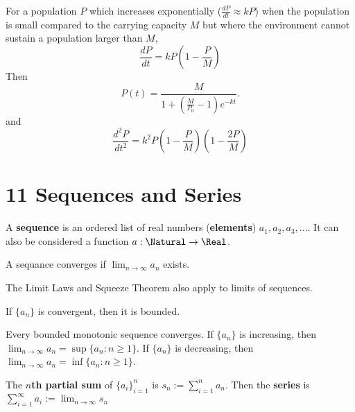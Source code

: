 \begin{definition} For a population $P$ which increases exponentially ($\frac{dP}{dt} \approx kP$) when the population is small compared to the carrying capacity $M$ but where the environment cannot sustain a population larger than $M$,
  \[
    \frac{dP}{dt} = kP \left(1 - \frac{P}{M}\right)
  \]
  Then
  \[
    P(t) = \frac{M}{1 + \left(\frac{M}{P_0} - 1\right)e^{-kt}}.
  \]
  and
  \[
    \frac{d^2P}{dt^2} = k^2P \left(1 - \frac{P}{M}\right) \left(1 - \frac{2P}{M}\right)
  \]
\end{definition}

\section*{11 Sequences and Series}

\begin{definition}[Sequence] A \textbf{sequence} is an ordered list of real numbers (\textbf{elements}) $a_1, a_2, a_3, ...$. It can also be considered a function $a: \Natural \to \Real$.
\end{definition}

\begin{definition}[Convergence] A sequance converges if $\lim_{n \to \infty} a_n$ exists.
\end{definition}

\begin{theorem} The Limit Laws and Squeeze Theorem also apply to limits of sequences.
\end{theorem}

\begin{theorem} If $\{ a_n \}$ is convergent, then it is bounded.
\end{theorem}

\begin{theorem} Every bounded monotonic sequence converges. If $\{ a_n \}$ is increasing, then $\displaystyle\lim_{n \to \infty} a_n = \sup \{ a_n : n \geq 1 \}$. If $\{ a_n \}$ is decreasing, then $\displaystyle\lim_{n \to \infty} a_n = \inf \{ a_n : n \geq 1 \}$.
\end{theorem}

\begin{definition}[Series] The \textbf{$n$th partial sum} of $\{ a_i \}_{i=1}^n$ is $s_n := \sum_{i = 1}^n a_n$. Then the \textbf{series} is $\sum_{i = 1}^\infty a_i := \lim_{n \to \infty} s_n$
\end{definition}

